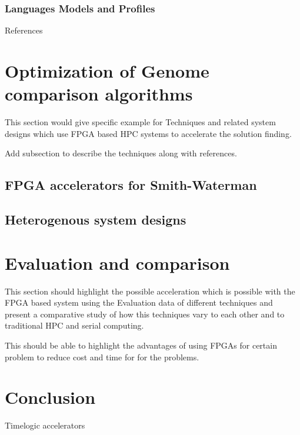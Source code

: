 \documentclass[12pt,twoside]{article}
\begin{document}
\subsubsection{Languages Models and Profiles}
References \cite{oliver_integrating_2008} \cite{abbas_combining_2015}
\section{Optimization of Genome comparison algorithms}
\label{sec:designtech}
This section would give specific example for Techniques and related system designs which
use FPGA based HPC systems to accelerate the solution finding.

Add subsection to describe the techniques along with references.

\subsection{FPGA accelerators for Smith-Waterman}
\subsection{Heterogenous system designs}

\section{Evaluation and comparison}
\label{sec:eval}

This section should highlight the possible acceleration which is possible with the FPGA based system
using the Evaluation data of different techniques and present a comparative study of how this techniques
vary to each other and to traditional HPC and serial computing.

This should be able to highlight the advantages of using FPGAs for certain problem to reduce cost and time for
for the problems.

\section{Conclusion}
\label{sec:concl}

Timelogic accelerators

\printbibliography
\end{document}

